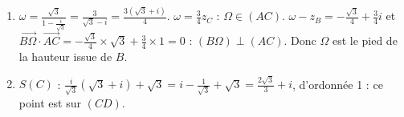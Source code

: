 \begin{corrige}
\begin{enumerate}
\begin{enumerate}
            $z' = \frac{i}{\sqrt{3}}z + \sqrt{3}$. Rapport $\frac{1}{\sqrt{3}}$, angle $\frac{\pi}{2}$.
      \item $\omega = \frac{\sqrt{3}}{1 - \frac{i}{\sqrt{3}}} = \frac{3}{\sqrt{3} - i} = \frac{3(\sqrt{3} + i)}{4}$.
            $\omega = \frac{3}{4}z_C$ : $\Omega \in (AC)$. $\omega - z_B = -\frac{\sqrt{3}}{4} + \frac{3}{4}i$ et
            $\overrightarrow{B\Omega}\cdot\overrightarrow{AC} = -\frac{\sqrt{3}}{4}\times\sqrt{3} + \frac{3}{4}\times 1 = 0$ : $(B\Omega) \perp (AC)$.
            Donc $\Omega$ est le pied de la hauteur issue de $B$.
      \item $S(C)$ : $\frac{i}{\sqrt{3}}(\sqrt{3} + i) + \sqrt{3} = i - \frac{1}{\sqrt{3}} + \sqrt{3} = \frac{2\sqrt{3}}{3} + i$, d'ordonn\'ee 1 :
            ce point est sur $(CD)$.
      \end{enumerate}
\end{enumerate}


\end{corrige}
